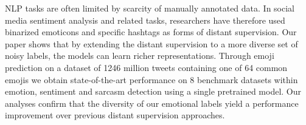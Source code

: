 NLP tasks are often limited by scarcity of manually annotated data. In social media sentiment analysis and related tasks, researchers have therefore used binarized emoticons and specific hashtags as forms of distant supervision. Our paper shows that by extending the distant supervision to a more diverse set of noisy labels, the models can learn richer representations. Through emoji prediction on a dataset of 1246 million tweets containing one of 64 common emojis we obtain state-of-the-art performance on 8 benchmark datasets within emotion, sentiment and sarcasm detection using a single pretrained model. Our analyses confirm that the diversity of our emotional labels yield a performance improvement over previous distant supervision approaches.
